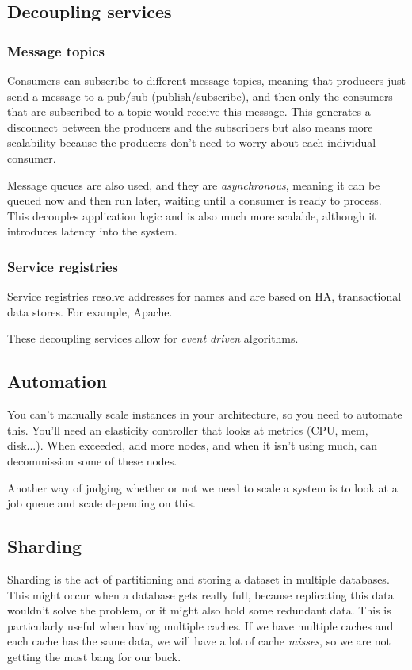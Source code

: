 \documentclass[11pt,a4paper,titlepage,dvipsnames,cmyk]{scrartcl}
\begin{document}
\subsection{Decoupling services}

\subsubsection{Message topics}
Consumers can subscribe to different message topics, meaning that producers just send a message to a pub/sub (publish/subscribe), and then only the consumers that are subscribed to a topic would receive this message. This generates a disconnect between the producers and the subscribers but also means more scalability because the producers don't need to worry about each individual consumer.

Message queues are also used, and they are \textit{asynchronous}, meaning it can be queued now and then run later, waiting until a consumer is ready to process. This decouples application logic and is also much more scalable, although it introduces latency into the system.

\subsubsection{Service registries}
Service registries resolve addresses for names and are based on HA, transactional data stores. For example, Apache.

These decoupling services allow for \textit{event driven} algorithms.

\subsection{Automation}
You can't manually scale instances in your architecture, so you need to automate this. You'll need an elasticity controller that looks at metrics (CPU, mem, disk...). When exceeded, add more nodes, and when it isn't using much, can decommission some of these nodes.

Another way of judging whether or not we need to scale a system is to look at a job queue and scale depending on this.

\subsection{Sharding}
Sharding is the act of partitioning and storing a dataset in multiple databases. This might occur when a database gets really full, because replicating this data wouldn't solve the problem, or it might also hold some redundant data. This is particularly useful when having multiple caches. If we have multiple caches and each cache has the same data, we will have a lot of cache \textit{misses}, so we are not getting the most bang for our buck.
\end{document}
